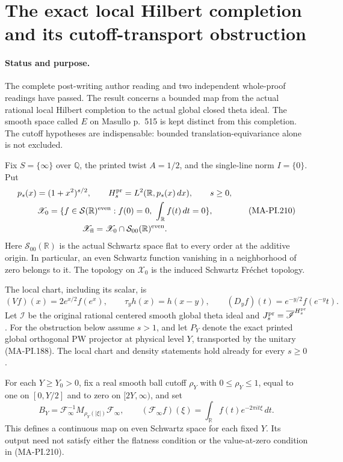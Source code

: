 \section{The exact local Hilbert completion and its cutoff-transport obstruction}
\label{sec:local-hilbert-cutoff-obstruction}

\paragraph{Status and purpose.}
The complete post-writing author reading and two independent
whole-proof readings have passed.
The result concerns a bounded map from the actual rational local
Hilbert completion to the actual global closed theta ideal.
The smooth space called \(E\) on Masullo p.~515 is kept distinct
from this completion.  The cutoff hypotheses are indispensable:
bounded translation-equivariance alone is not excluded.

Fix \(S=\{\infty\}\) over \(\mathbb Q\), the printed twist
\(A=1/2\), and the single-line norm \(I=\{0\}\).  Put
\[
 \begin{gathered}
 p_s(x)=(1+x^2)^{s/2},\qquad
 H_s^{\rm pr}=L^2(\mathbb R,p_s(x)\,dx),\qquad s\ge0,\\
 \mathscr X_0=\{f\in\mathcal S(\mathbb R)^{\rm even}:
                       f(0)=0,\ \int_{\mathbb R}f(t)\,dt=0\},\\
 \mathscr X_{\rm fl}=\mathscr X_0\cap
                         \mathcal S_{00}(\mathbb R)^{\rm even}.
 \end{gathered}
 \tag{MA-PI.210}
\]
Here \(\mathcal S_{00}(\mathbb R)\) is the actual Schwartz
space flat to every order at the additive origin.  In particular,
an even Schwartz function vanishing in a neighborhood of zero
belongs to it.  The topology on \(\mathscr X_0\) is the induced
Schwartz Fr\'echet topology.

The local chart, including its scalar, is
\[
 (Vf)(x)=2e^{x/2}f(e^x),\qquad
 \tau_yh(x)=h(x-y),\qquad
 (D_yf)(t)=e^{-y/2}f(e^{-y}t).
 \tag{MA-PI.211}
\]
Let \(\mathscr I\) be the original rational centered smooth
global theta ideal and \(J_s^{\rm pr}=\overline{\mathscr I}^{H_s^{\rm pr}}\).
For the obstruction below assume \(s>1\), and let \(P_Y\)
denote the exact printed global orthogonal PW projector at
physical level \(Y\), transported by the unitary (MA-PI.188).
The local chart and density statements hold already for every
\(s\ge0\).

For each \(Y\ge Y_0>0\), fix a real smooth ball cutoff
\(\rho_Y\) with \(0\le\rho_Y\le1\), equal to one on
\([0,Y/2]\) and to zero on \([2Y,\infty)\), and set
\[
 B_Y=\mathcal F_\infty^{-1}M_{\rho_Y(|\xi|)}\mathcal F_\infty,
 \qquad
 (\mathcal F_\infty f)(\xi)=
                  \int_{\mathbb R}f(t)e^{-2\pi it\xi}\,dt.
 \tag{MA-PI.212}
\]
This defines a continuous map on even Schwartz space for each
fixed \(Y\).  Its output need not satisfy either the flatness
condition or the value-at-zero condition in (MA-PI.210).

